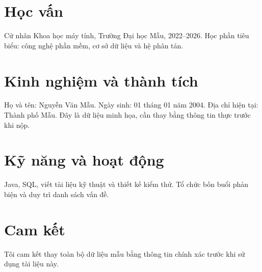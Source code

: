 \section{Học vấn}
Cử nhân Khoa học máy tính, Trường Đại học Mẫu, 2022--2026. Học phần tiêu biểu: công nghệ phần mềm, cơ sở dữ liệu và hệ phân tán.

\section{Kinh nghiệm và thành tích}
Họ và tên: Nguyễn Văn Mẫu. Ngày sinh: 01 tháng 01 năm 2004. Địa chỉ hiện tại: Thành phố Mẫu. Đây là dữ liệu minh họa, cần thay bằng thông tin thực trước khi nộp.

\section{Kỹ năng và hoạt động}
Java, SQL, viết tài liệu kỹ thuật và thiết kế kiểm thử. Tổ chức bốn buổi phản biện và duy trì danh sách vấn đề.

\section{Cam kết}
Tôi cam kết thay toàn bộ dữ liệu mẫu bằng thông tin chính xác trước khi sử dụng tài liệu này.


